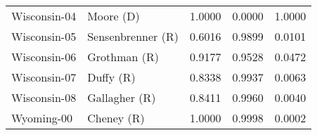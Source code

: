 \begin{longtable}{llrll}
      Wisconsin-04 &            {\color{Blue} Moore (D)} &       1.0000 &        0.0000 &        1.0000 \\
      Wisconsin-05 &     {\color{Red} Sensenbrenner (R)} &       0.6016 &        0.9899 &        0.0101 \\
      Wisconsin-06 &          {\color{Red} Grothman (R)} &       0.9177 &        0.9528 &        0.0472 \\
      Wisconsin-07 &             {\color{Red} Duffy (R)} &       0.8338 &        0.9937 &        0.0063 \\
      Wisconsin-08 &         {\color{Red} Gallagher (R)} &       0.8411 &        0.9960 &        0.0040 \\
        Wyoming-00 &            {\color{Red} Cheney (R)} &       1.0000 &        0.9998 &        0.0002 \\
\end{longtable}
